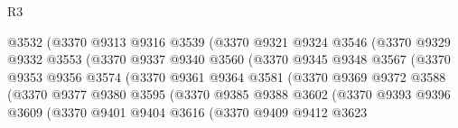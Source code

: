 \begin{lexlean}{R3}
\begin{coremodule}
                              @3532
                              (@3370
                                @9313
                                @9316
                                @3539
                                (@3370
                                  @9321
                                  @9324
                                  @3546
                                  (@3370
                                    @9329
                                    @9332
                                    @3553
                                    (@3370
                                      @9337
                                      @9340
                                      @3560
                                      (@3370
                                        @9345
                                        @9348
                                        @3567
                                        (@3370
                                          @9353
                                          @9356
                                          @3574
                                          (@3370
                                            @9361
                                            @9364
                                            @3581
                                            (@3370
                                              @9369
                                              @9372
                                              @3588
                                              (@3370
                                                @9377
                                                @9380
                                                @3595
                                                (@3370
                                                  @9385
                                                  @9388
                                                  @3602
                                                  (@3370
                                                    @9393
                                                    @9396
                                                    @3609
                                                    (@3370
                                                      @9401
                                                      @9404
                                                      @3616
                                                      (@3370
                                                        @9409
                                                        @9412
                                                        @3623

\end{coremodule}
\end{lexlean}
